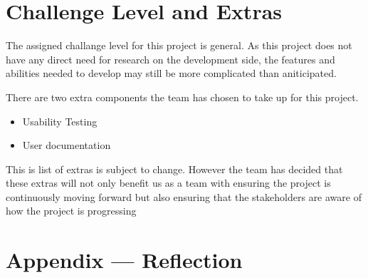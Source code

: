 \documentclass{article}
\begin{document}
\section{Challenge Level and Extras}

The assigned challange level for this project is general. As this project does
not have any direct need for research on the development side, the features and
abilities needed to develop may still be more complicated than aniticipated. 

There are two extra components the team has chosen to take up for this project. 
\begin{itemize}
    \item Usability Testing
    \item User documentation
\end{itemize}
This is list of extras is subject to change. However the team has decided that
these extras will not only benefit us as a team with ensuring the project is
continuously moving forward but also ensuring that the stakeholders are aware of
how the project is progressing

\newpage{}

\section*{Appendix --- Reflection}


\end{document}
